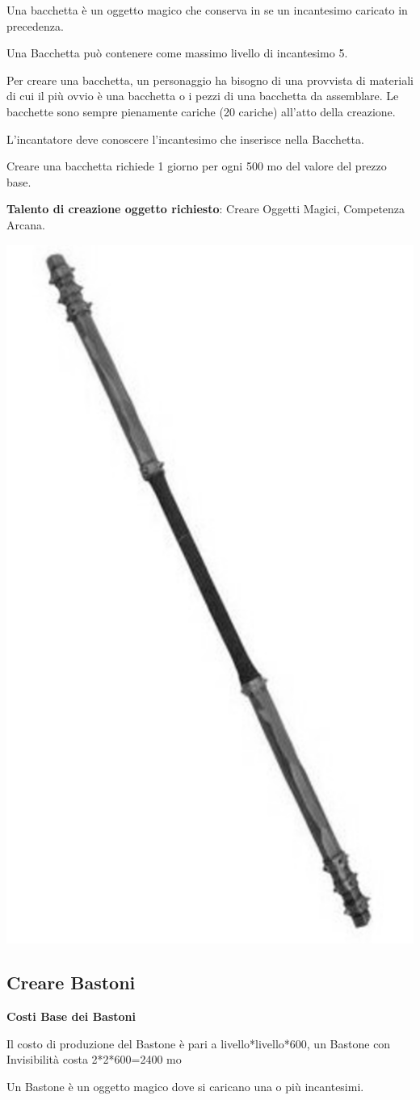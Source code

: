\begin{multicols}{2}
Una bacchetta è un oggetto magico che conserva in se un incantesimo caricato in precedenza.

Una Bacchetta può contenere come massimo livello di incantesimo 5.

Per creare una bacchetta, un personaggio ha bisogno di una provvista di materiali di cui il più ovvio è una bacchetta o i pezzi di una bacchetta da assemblare. Le bacchette sono sempre pienamente cariche (20 cariche) all'atto della creazione.

L'incantatore deve conoscere l'incantesimo che inserisce nella Bacchetta.

Creare una bacchetta richiede 1 giorno per ogni 500 mo del valore del prezzo base.

\medskip

\textbf{Talento di creazione oggetto richiesto}: Creare Oggetti Magici, Competenza Arcana.

\begin{center}
	\includegraphics[width=0.35\linewidth]{immagini/staff2.png}
\end{center}

\subsection{Creare Bastoni}\label{crearebastoni}

\textbf{Costi Base dei Bastoni}

\bigskip

Il costo di produzione del Bastone è pari a livello*livello*600, un Bastone con Invisibilità costa 2*2*600=2400 mo

\bigskip

Un Bastone è un oggetto magico dove si caricano una o più incantesimi.


\end{multicols}
